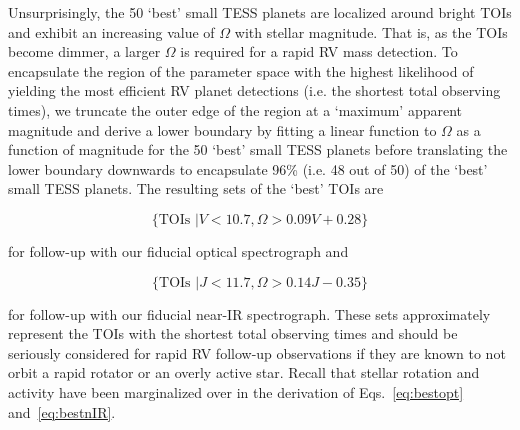 Unsurprisingly, the 50 `best' small TESS planets are localized around bright TOIs and
exhibit an increasing value of $\Omega$ with stellar magnitude. That is, as the TOIs become dimmer,
a larger $\Omega$ is required for a rapid RV mass detection. To encapsulate the region of the parameter space
with the highest likelihood of yielding the most efficient RV planet detections (i.e. the shortest total
observing times), we truncate the outer edge of the
region at a `maximum' apparent magnitude and derive a lower boundary by fitting a linear function to 
$\Omega$ as a function of magnitude for the 
50 `best' small TESS planets before translating the lower boundary downwards to encapsulate 96\%
(i.e. 48 out of 50) of the `best' small TESS planets. The resulting sets of the `best' TOIs are 

\begin{equation}
  \{ \text{TOIs } | V < 10.7, \Omega > 0.09 V + 0.28 \}
  \label{eq:bestopt}
\end{equation}

\noindent for follow-up with our fiducial optical spectrograph and 

\begin{equation}
  \{ \text{TOIs } | J < 11.7, \Omega > 0.14 J - 0.35 \}
  \label{eq:bestnIR}
\end{equation}

\noindent for follow-up with our fiducial near-IR spectrograph. These sets approximately represent the TOIs with
the shortest total observing times and should be seriously considered for rapid RV follow-up observations
if they are known to not orbit a rapid rotator or an overly active star.
Recall that stellar rotation and activity have been marginalized over in the derivation of
Eqs.~\ref{eq:bestopt} and~\ref{eq:bestnIR}.

